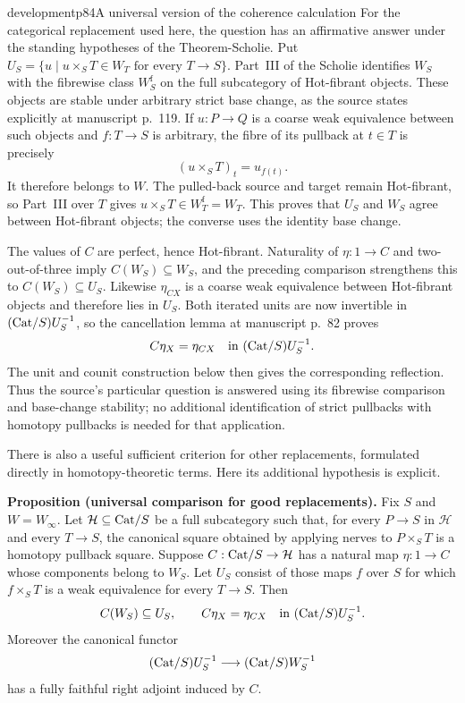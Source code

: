 \begin{dcomment}{development}{p84}{A universal version of the coherence calculation}
For the categorical replacement used here, the question has an affirmative answer under the standing hypotheses of the Theorem-Scholie. Put $U_S=\{u\mid u\times_ST\in W_T\text{ for every }T\to S\}$. Part~III of the Scholie identifies $W_S$ with the fibrewise class $W_S^{\mathrm f}$ on the full subcategory of Hot-fibrant objects. These objects are stable under arbitrary strict base change, as the source states explicitly at manuscript p.~119. If $u:P\to Q$ is a coarse weak equivalence between such objects and $f:T\to S$ is arbitrary, the fibre of its pullback at $t\in T$ is precisely
\[
 (u\times_ST)_t=u_{f(t)}.
\]
It therefore belongs to $W$. The pulled-back source and target remain Hot-fibrant, so Part~III over $T$ gives $u\times_ST\in W_T^{\mathrm f}=W_T$. This proves that $U_S$ and $W_S$ agree between Hot-fibrant objects; the converse uses the identity base change.

The values of $C$ are perfect, hence Hot-fibrant. Naturality of $\eta:1\to C$ and two-out-of-three imply $C(W_S)\subseteq W_S$, and the preceding comparison strengthens this to $C(W_S)\subseteq U_S$. Likewise $\eta_{CX}$ is a coarse weak equivalence between Hot-fibrant objects and therefore lies in $U_S$. Both iterated units are now invertible in $(\mathrm{Cat}/S)U_S^{-1}$, so the cancellation lemma at manuscript p.~82 proves
\[
 C\eta_X=\eta_{CX}\quad\hbox{in }(\mathrm{Cat}/S)U_S^{-1}.
\]
The unit and counit construction below then gives the corresponding reflection. Thus the source's particular question is answered using its fibrewise comparison and base-change stability; no additional identification of strict pullbacks with homotopy pullbacks is needed for that application.

There is also a useful sufficient criterion for other replacements, formulated directly in homotopy-theoretic terms. Here its additional hypothesis is explicit.

\textbf{Proposition (universal comparison for good replacements).}\ours
Fix $S$ and $W=W_\infty$. Let $\mathcal H\subseteq\mathrm{Cat}/S$ be a full subcategory such that, for every $P\to S$ in $\mathcal H$ and every $T\to S$, the canonical square obtained by applying nerves to $P\times_ST$ is a homotopy pullback square. Suppose $C:\mathrm{Cat}/S\to\mathcal H$ has a natural map $\eta:1\to C$ whose components belong to $W_S$. Let $U_S$ consist of those maps $f$ over $S$ for which $f\times_ST$ is a weak equivalence for every $T\to S$. Then
\[
 C(W_S)\subseteq U_S,\qquad
 C\eta_X=\eta_{CX}\quad\hbox{in }(\mathrm{Cat}/S)U_S^{-1}.
\]
Moreover the canonical functor
\[
 (\mathrm{Cat}/S)U_S^{-1}\longrightarrow(\mathrm{Cat}/S)W_S^{-1}
\]
has a fully faithful right adjoint induced by $C$.


\end{dcomment}
